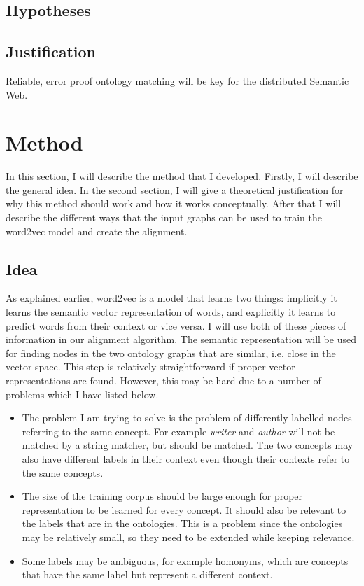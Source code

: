 \documentclass{article}
\begin{document}
 
 \subsection{Hypotheses}
 
 
 \subsection{Justification}
 Reliable, error proof ontology matching will be key for the distributed Semantic Web.
 
 \section{Method}
 In this section, I will describe the method that I developed. Firstly, I will describe the general idea. In the second section, I will give a theoretical justification for why this method should work and how it works conceptually. After that I will describe the different ways that the input graphs can be used to train the word2vec model and create the alignment. 
 \subsection{Idea}
 As explained earlier, word2vec is a model that learns two things: implicitly it learns the semantic vector representation of words, and explicitly it learns to predict words from their context or vice versa. I will use both of these pieces of information in our alignment algorithm.
 The semantic representation will be used for finding nodes in the two ontology graphs that are similar, i.e. close in the vector space. This step is relatively straightforward if proper vector representations are found. However, this may be hard due to a number of problems which I have listed below.

 \begin{itemize}
  \item The problem I am trying to solve is the problem of differently labelled nodes referring to the same concept. For example \emph{writer} and \emph{author} will not be matched by a string matcher, but should be matched. The two concepts may also have different labels in their context even though their contexts refer to the same concepts.
  \item The size of the training corpus should be large enough for proper representation to be learned for every concept. It should also be relevant to the labels that are in the ontologies. This is a problem since the ontologies may be relatively small, so they need to be extended while keeping relevance.
  \item Some labels may be ambiguous, for example homonyms, which are concepts that have the same label but represent a different context.
 \end{itemize}
 
\end{document}
